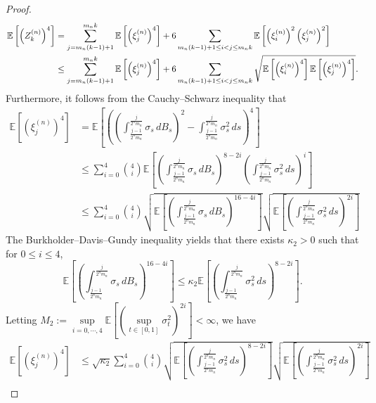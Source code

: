 \documentclass[12pt,reqno]{article}
\newcommand\scalemath[2]{\scalebox{#1}{\mbox{\ensuremath{\displaystyle #2}}}}
\numberwithin{equation}{section}
\theoremstyle{definition}
\newcommand{\bE}{\mathbb{E}}
\begin{document}
\begin{proof}
	\begin{equation}\label{eq Zn fourth}
		\scalemath{0.9}{\begin{split}
				\bE\left[\left(Z^{(n)}_k\right)^4\right] &= \sum_{j = m_n(k-1) + 1}^{m_n k} \bE\left[\left(\xi^{(n)}_j\right)^4\right] + 6 \sum_{m_n(k-1)+1 \le i < j \le m_n k} \bE\left[\left(\xi^{(n)}_i\right)^2\left(\xi^{(n)}_j\right)^2\right] \\&\le \sum_{j = m_n(k-1) + 1}^{m_n k} \bE\left[\left(\xi^{(n)}_j\right)^4\right] + 6 \sum_{m_n(k-1)+1 \le i < j \le m_n k} \sqrt{\bE\left[\left(\xi^{(n)}_i\right)^4\right]\bE\left[\left(\xi^{(n)}_j\right)^4\right]}.
		\end{split}}
	\end{equation}
	Furthermore, it follows from the Cauchy--Schwarz inequality that 
	\begin{equation*}
		\begin{split}
			\bE\left[\left(\xi^{(n)}_{j}\right)^4\right] &= \bE\left[\left(\left(\int^{\frac{j}{2^n m_n}}_{\frac{j-1}{2^n m_n}}\sigma_s\,dB_s\right)^2 - \int^{\frac{j}{2^n m_n}}_{\frac{j-1}{2^n m_n}}\sigma^2_s\,ds\right)^4\right]\\&\le \sum_{i = 0}^{4}{4 \choose i}\bE\left[\left(\int^{\frac{j}{2^n m_n}}_{\frac{j-1}{2^n m_n}}\sigma_s\,dB_s\right)^{8-2i}\left(\int^{\frac{j}{2^n m_n}}_{\frac{j-1}{2^n m_n}}\sigma^2_s\,ds\right)^{i}\right]\\&\le \sum_{i = 0}^{4}{4 \choose i}\sqrt{\bE\left[\left(\int^{\frac{j}{2^n m_n}}_{\frac{j-1}{2^n m_n}}\sigma_s\,dB_s\right)^{16-4i}\right]}\sqrt{\bE\left[\left(\int^{\frac{j}{2^n m_n}}_{\frac{j-1}{2^n m_n}}\sigma^2_s\,ds\right)^{2i}\right]}
		\end{split}
	\end{equation*}
	The Burkholder--Davis--Gundy inequality yields that there exists $\kappa_2 > 0$ such that for $0 \le i \le 4$, 
	\begin{equation*}
		\bE\left[\left(\int^{\frac{j}{2^n m_n}}_{\frac{j-1}{2^n m_n}}\sigma_s\,dB_s\right)^{16-4i}\right] \le \kappa_2 \bE\left[\left(\int^{\frac{j}{2^n m_n}}_{\frac{j-1}{2^n m_n}}\sigma^2_s\,ds\right)^{8-2i}\right].
	\end{equation*}
	Letting $M_2 := \sup\limits_{i = 0,\cdots,4} \bE\left[\left(\sup\limits_{t \in [0,1]}\sigma_t^2\right)^{2i}\right] < \infty$,  we  have  
	\begin{equation*}
		\begin{split}
			\bE\left[\left(\xi^{(n)}_{j}\right)^4\right] &\le \sqrt{\kappa_2}\sum_{i = 0}^{4}{4 \choose i}\sqrt{\bE\left[\left(\int^{\frac{j}{2^n m_n}}_{\frac{j-1}{2^n m_n}}\sigma^2_s \,ds\right)^{8-2i}\right]}\sqrt{\bE\left[\left(\int^{\frac{j}{2^n m_n}}_{\frac{j-1}{2^n m_n}}\sigma^2_s\,ds\right)^{2i}\right]}\\

\end{split}
\end{equation*}
\end{proof}
\end{document}
